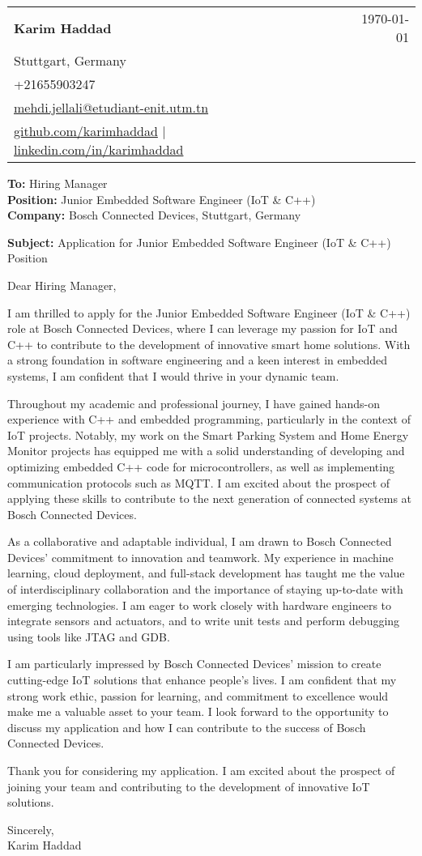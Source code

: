 \documentclass[letterpaper,11pt]{article}
\makeatletter
\newcommand{\letterHeading}[5]{
    \begin{tabular*}{\textwidth}{l@{\extracolsep{\fill}}r}
    \textbf{\Large #1} & #5 \\  %
    #2 & \\
    #3 & \\
    #4 & \\
    \end{tabular*}
    \vspace{15pt}
}
\newcommand{\letterRecipient}[3]{
    \textbf{\large To:} #1 \\
    \textbf{\large Position:} #2 \\
    \textbf{\large Company:} #3 \\
    \vspace{12pt}
}
\newcommand{\letterSubject}[1]{
    \textbf{\large Subject:} #1 \\
    \vspace{15pt}
}
\makeatother
\begin{document}
    \letterHeading
    {Karim Haddad}
    {Stuttgart, Germany}
    {+21655903247 \\ \href{mailto:mehdi.jellali@etudiant-enit.utm.tn}{mehdi.jellali@etudiant-enit.utm.tn}}
    {\href{https://github.com/karimhaddad}{github.com/karimhaddad} $|$ \href{https://www.linkedin.com/in/karimhaddad}{linkedin.com/in/karimhaddad}}
    {\today}

    \letterRecipient
    {Hiring Manager}
    {Junior Embedded Software Engineer (IoT & C++)}
    {Bosch Connected Devices, Stuttgart, Germany}

    \letterSubject{Application for Junior Embedded Software Engineer (IoT & C++) Position}

    Dear Hiring Manager,

    I am thrilled to apply for the Junior Embedded Software Engineer (IoT & C++) role at Bosch Connected Devices, where I can leverage my passion for IoT and C++ to contribute to the development of innovative smart home solutions. With a strong foundation in software engineering and a keen interest in embedded systems, I am confident that I would thrive in your dynamic team.

    Throughout my academic and professional journey, I have gained hands-on experience with C++ and embedded programming, particularly in the context of IoT projects. Notably, my work on the Smart Parking System and Home Energy Monitor projects has equipped me with a solid understanding of developing and optimizing embedded C++ code for microcontrollers, as well as implementing communication protocols such as MQTT. I am excited about the prospect of applying these skills to contribute to the next generation of connected systems at Bosch Connected Devices.

    As a collaborative and adaptable individual, I am drawn to Bosch Connected Devices' commitment to innovation and teamwork. My experience in machine learning, cloud deployment, and full-stack development has taught me the value of interdisciplinary collaboration and the importance of staying up-to-date with emerging technologies. I am eager to work closely with hardware engineers to integrate sensors and actuators, and to write unit tests and perform debugging using tools like JTAG and GDB.

    I am particularly impressed by Bosch Connected Devices' mission to create cutting-edge IoT solutions that enhance people's lives. I am confident that my strong work ethic, passion for learning, and commitment to excellence would make me a valuable asset to your team. I look forward to the opportunity to discuss my application and how I can contribute to the success of Bosch Connected Devices.

    Thank you for considering my application. I am excited about the prospect of joining your team and contributing to the development of innovative IoT solutions.

    Sincerely,\\[12pt]

    Karim Haddad
\end{document}
